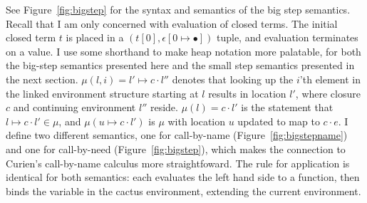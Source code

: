 See Figure~\ref{fig:bigstep} for the syntax and semantics of the \ce big step
semantics. Recall that I am only concerned with evaluation of closed terms.
The initial closed term $t$ is placed in a $(t[0],\epsilon[0 \mapsto \bullet])$
tuple, and evaluation terminates on a value. I use some shorthand to make heap
notation more palatable, for both the big-step semantics presented here and the
small step semantics presented in the next section. $\mu(l,i)=l' \mapsto c \cdot
l''$ denotes that looking up the $i$'th element in the linked
environment structure starting at $l$ results in location $l'$, where closure
$c$ and continuing environment $l''$ reside. $\mu(l) = c \cdot l'$ is the
statement that $l \mapsto c \cdot l' \in \mu$, and $\mu(u \mapsto c \cdot l')$
is $\mu$ with location $u$ updated to map to $c \cdot e$. I define two
different semantics, one for call-by-name (Figure~\ref{fig:bigstepname}) and one
for call-by-need (Figure~\ref{fig:bigstep}), which makes the connection to Curien's
call-by-name calculus more straightfoward. The rule for application is
identical for both semantics: each evaluates the left hand side to a function,
then binds the variable in the cactus environment, extending the current
environment.

